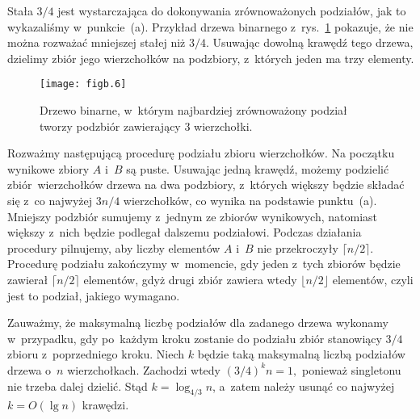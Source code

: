 \subproblem %
Stała $3/4$ jest wystarczająca do dokonywania zrównoważonych podziałów, jak to wykazaliśmy w~punkcie~(a). Przykład drzewa binarnego z~rys.~\ref{fig:B-3b} pokazuje, że nie można rozważać mniejszej stałej niż $3/4$. Usuwając dowolną krawędź tego drzewa, dzielimy zbiór jego wierzchołków na podzbiory, z~których jeden ma trzy elementy.
\begin{figure}[ht]
	\begin{center}
		\texttt{[image: figb.6]}
	\end{center}
	\caption{Drzewo binarne, w~którym najbardziej zrównoważony podział tworzy podzbiór zawierający 3 wierzchołki.} \label{fig:B-3b}
\end{figure}

\subproblem %
Rozważmy następującą procedurę podziału zbioru wierzchołków. Na początku wynikowe zbiory $A$ i~$B$ są puste. Usuwając jedną krawędź, możemy podzielić  zbiór~wierzchołków drzewa na dwa podzbiory, z~których większy będzie składać się z~co najwyżej $3n/4$ wierzchołków, co wynika na podstawie punktu~(a). Mniejszy podzbiór sumujemy z~jednym ze zbiorów wynikowych, natomiast większy z~nich będzie podlegał dalszemu podziałowi. Podczas działania procedury pilnujemy, aby liczby elementów $A$ i~$B$ nie przekroczyły $\lceil n/2\rceil$. Procedurę podziału zakończymy w~momencie, gdy jeden z~tych zbiorów będzie zawierał $\lceil n/2\rceil$ elementów, gdyż drugi zbiór zawiera wtedy $\lfloor n/2\rfloor$ elementów, czyli jest to podział, jakiego wymagano.

Zauważmy, że maksymalną liczbę podziałów dla zadanego drzewa wykonamy w~przypadku, gdy po~każdym kroku zostanie do podziału zbiór stanowiący $3/4$ zbioru z~poprzedniego kroku. Niech $k$ będzie taką maksymalną liczbą podziałów drzewa o~$n$ wierzchołkach. Zachodzi wtedy
$(3/4)^kn = 1,$
ponieważ singletonu nie trzeba dalej dzielić. Stąd $k=\log_{4/3}n$, a~zatem należy usunąć co najwyżej $k=O(\lg n)$ krawędzi.

\endinput
